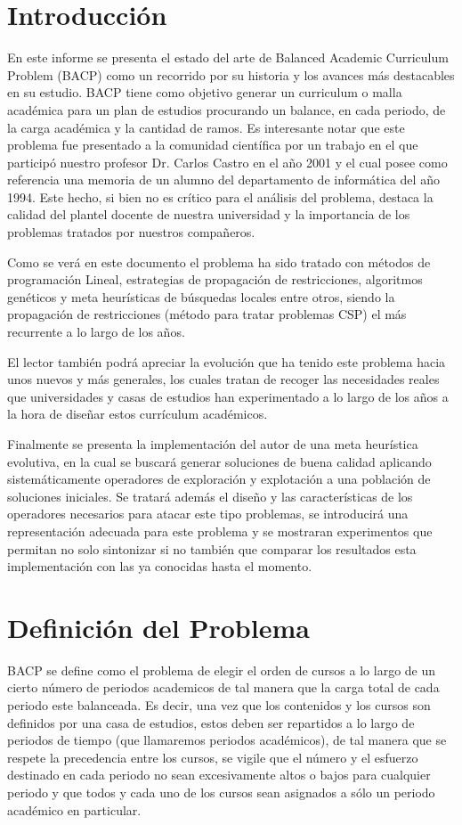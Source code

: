 \documentclass[letter, 10pt]{article}
\begin{document}
\section{Introducción}
En este informe se presenta el estado del arte de Balanced Academic Curriculum
Problem (BACP) como un recorrido por su historia y los avances más destacables
en su estudio.  BACP tiene como objetivo generar un curriculum o malla académica
para un plan de estudios procurando un balance, en cada periodo, de la carga
académica y la cantidad de ramos. Es interesante notar que este problema fue
presentado a la comunidad científica por un trabajo en el que participó nuestro
profesor Dr. Carlos Castro\cite{castro2001variable} en el año 2001 y el cual
posee como referencia una memoria de un alumno del departamento de informática
del año 1994\cite{vergara}. Este hecho, si bien no es crítico para el análisis
del problema, destaca la calidad del plantel docente de nuestra universidad y la
importancia de los problemas tratados por nuestros compañeros.

Como se verá en este documento el problema ha sido tratado con métodos de
programación Lineal, estrategias de propagación de restricciones, algoritmos
genéticos y meta heurísticas de búsquedas locales entre otros, siendo la
propagación de restricciones (método para tratar problemas CSP) el más
recurrente a lo largo de los años.

El lector también podrá apreciar la evolución que ha tenido este
problema hacia unos nuevos y más generales, los cuales tratan de
recoger las necesidades reales que universidades y casas de estudios
han experimentado a lo largo de los años a la hora de diseñar estos
currículum académicos.

Finalmente se presenta la implementación del autor de una meta
heurística evolutiva, en la cual se buscará generar soluciones de
buena calidad aplicando sistemáticamente operadores de exploración y
explotación a una población de soluciones iniciales. Se tratará además
el diseño y las características de los operadores necesarios para
atacar este tipo problemas, se introducirá una representación adecuada
para este problema y se mostraran experimentos que permitan no solo
sintonizar si no también que comparar los resultados esta implementación con
las ya conocidas hasta el momento.



\section{Definición del Problema}
BACP se define como el problema de elegir el orden de cursos a lo largo
de un cierto número de periodos academicos de tal manera que la carga
total de cada periodo este balanceada. Es decir, una vez que los
contenidos y los cursos son definidos por una casa de estudios, estos
deben ser repartidos a lo largo de periodos de tiempo (que llamaremos
periodos académicos), de tal manera que se respete la precedencia entre
los cursos, se vigile que el número y el esfuerzo destinado en cada
periodo no sean excesivamente altos o bajos para cualquier periodo y que
todos y cada uno de los cursos sean asignados a sólo un periodo
académico en particular.
\end{document}
